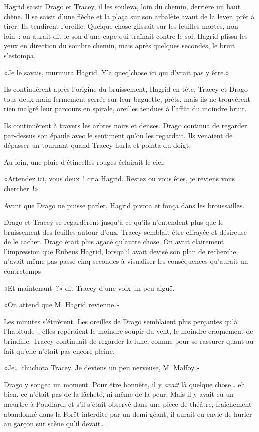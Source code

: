 Hagrid saisit Drago et Tracey, il les souleva, loin du chemin, derrière un haut chêne. Il se saisit d'une flèche et la plaça sur son arbalète avant de la lever, prêt à tirer. Ils tendirent l'oreille. Quelque chose glissait sur les feuilles mortes, non loin~: on aurait dit le son d'une cape qui traînait contre le sol. Hagrid plissa les yeux en direction du sombre chemin, mais après quelques secondes, le bruit s'estompa.

«Je le savais, murmura Hagrid. Y'a queq'chose ici qui d'vrait pas y être.»

Ils continuèrent après l'origine du bruissement, Hagrid en tête, Tracey et Drago tous deux main fermement serrée sur leur baguette, prêts, mais ils ne trouvèrent rien malgré leur parcours en spirale, oreilles tendues à l'affût du moindre bruit.

Ils continuèrent à travers les arbres noirs et denses. Drago continua de regarder par-dessus son épaule avec le sentiment qu'on les regardait. Ils venaient de dépasser un tournant quand Tracey hurla et pointa du doigt.

Au loin, une pluie d'étincelles rouges éclairait le ciel.

«Attendez ici, vous deux~! cria Hagrid. Restez ou vous êtes, je reviens vous chercher~!»

Avant que Drago ne puisse parler, Hagrid pivota et fonça dans les broussailles.

Drago et Tracey se regardèrent jusqu'à ce qu'ils n'entendent plus que le bruissement des feuilles autour d'eux. Tracey semblait être effrayée et désireuse de le cacher. Drago était plus agacé qu'autre chose. On avait clairement l'impression que Rubeus Hagrid, lorsqu'il avait devisé son plan de recherche, n'avait même pas passé cinq secondes à visualiser les conséquences qu'aurait un contretemps.

«Et maintenant~?» dit Tracey d'une voix un peu aiguë.

«On attend que M. Hagrid revienne.»

Les minutes s'étirèrent. Les oreilles de Drago semblaient plus perçantes qu'à l'habitude~; elles repéraient le moindre soupir du vent, le moindre craquement de brindille. Tracey continuait de regarder la lune, comme pour se rassurer quant au fait qu'elle n'était pas encore pleine.

«Je… chuchota Tracey. Je deviens un peu nerveuse, M. Malfoy.»

Drago y songea un moment. Pour être honnête, il y \emph{avait} là quelque chose… eh bien, ce n'était pas de la lâcheté, ni même de la peur. Mais il y avait eu un meurtre à Poudlard, et s'il s'était observé dans une pièce de théâtre, fraîchement abandonné dans la Forêt interdite par un demi-géant, il aurait eu envie de hurler au garçon sur scène qu'il devait…

